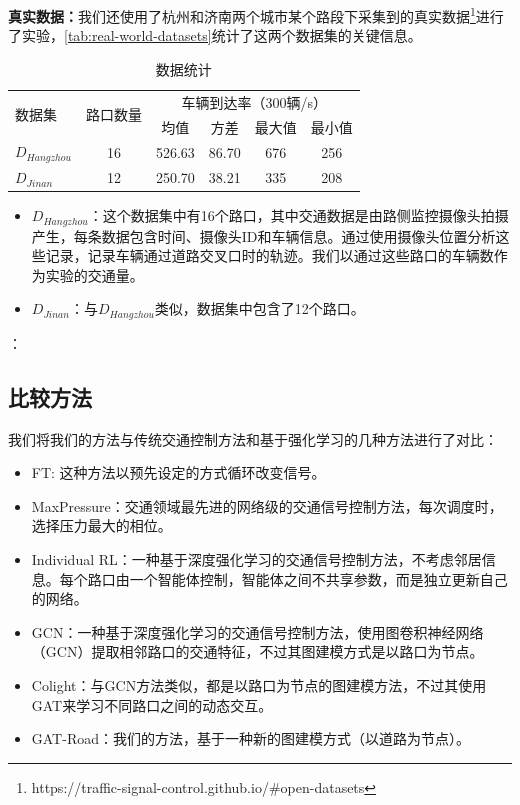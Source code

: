 \textbf{真实数据：}我们还使用了杭州和济南两个城市某个路段下采集到的真实数据\footnote{https://traffic-signal-control.github.io/\#open-datasets}进行了实验，\autoref{tab:real-world-datasets}统计了这两个数据集的关键信息。
\begin{table}[htb]
  \caption{数据统计}
  \label{tab:real-world-datasets}
  \begin{tabular}{lccccc}
  \toprule
  \multirow{2}{*}{数据集} & \multirow{2}{*}{路口数量} & \multicolumn{4}{c}{车辆到达率（300辆/s）} \\
  & & \multicolumn{1}{c}{均值} & \multicolumn{1}{c}{方差} & \multicolumn{1}{c}{最大值} & \multicolumn{1}{c}{最小值} \\
  \midrule
  $D_{Hangzhou}$ & 16 & 526.63 & 86.70 & 676 & 256 \\
  $D_{Jinan}$ & 12 & 250.70 & 38.21 & 335 & 208 \\
  \bottomrule
  \end{tabular}
\end{table}
\begin{itemize}
  \item $D_{Hangzhou}$：这个数据集中有16个路口，其中交通数据是由路侧监控摄像头拍摄产生，每条数据包含时间、摄像头ID和车辆信息。通过使用摄像头位置分析这些记录，记录车辆通过道路交叉口时的轨迹。我们以通过这些路口的车辆数作为实验的交通量。
  \item $D_{Jinan}$：与$D_{Hangzhou}$类似，数据集中包含了12个路口。
\end{itemize}：

\subsection{比较方法}
我们将我们的方法与传统交通控制方法和基于强化学习的几种方法进行了对比：
\begin{itemize}
  \item FT\cite{koonce2008traffic}: 这种方法以预先设定的方式循环改变信号。
  \item MaxPressure\cite{varaiya2013max}：交通领域最先进的网络级的交通信号控制方法，每次调度时，选择压力最大的相位。
  \item Individual RL\cite{wei2018intellilight}：一种基于深度强化学习的交通信号控制方法，不考虑邻居信息。每个路口由一个智能体控制，智能体之间不共享参数，而是独立更新自己的网络。
  \item GCN\cite{van2016coordinated}：一种基于深度强化学习的交通信号控制方法，使用图卷积神经网络（GCN）提取相邻路口的交通特征，不过其图建模方式是以路口为节点。
  \item Colight\cite{wei2019colight}：与GCN方法类似，都是以路口为节点的图建模方法，不过其使用GAT来学习不同路口之间的动态交互。
  \item GAT-Road：我们的方法，基于一种新的图建模方式（以道路为节点）。
\end{itemize}
